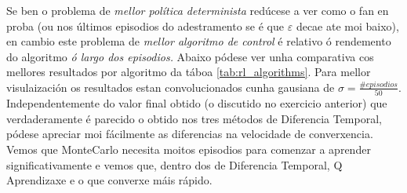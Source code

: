 \documentclass{article}
\begin{document}
Se ben o problema de \emph{mellor política determinista} redúcese a ver como o fan en proba (ou nos últimos episodios do adestramento se é que $\varepsilon$ decae ate moi baixo), en cambio este problema de \emph{mellor algoritmo de control} é relativo ó rendemento do algoritmo \emph{ó largo dos episodios.} Abaixo pódese ver unha comparativa cos mellores resultados por algoritmo da táboa \ref{tab:rl_algorithms}. Para mellor visulaización os resultados estan convolucionados cunha gausiana de $\sigma = \frac{\#episodios}{50}$. Independentemente do valor final obtido (o discutido no exercicio anterior) que verdaderamente é parecido o obtido nos tres métodos de Diferencia Temporal, pódese apreciar moi fácilmente as diferencias na velocidade de converxencia. Vemos que MonteCarlo necesita moitos episodios para comenzar a aprender significativamente e vemos que, dentro dos de Diferencia Temporal, Q Aprendizaxe e o que converxe máis rápido.
\end{document}
